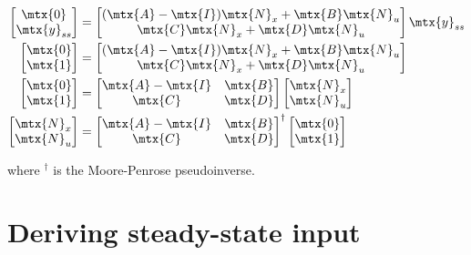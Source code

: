\begin{align*}
  \begin{bmatrix}
    \mtx{0} \\
    \mtx{y}_{ss}
  \end{bmatrix} &=
  \begin{bmatrix}
    (\mtx{A} - \mtx{I})\mtx{N}_x + \mtx{B}\mtx{N}_u \\
    \mtx{C}\mtx{N}_x + \mtx{D}\mtx{N}_u
  \end{bmatrix}
  \mtx{y}_{ss} \\
  \begin{bmatrix}
    \mtx{0} \\
    \mtx{1}
  \end{bmatrix} &=
  \begin{bmatrix}
    (\mtx{A} - \mtx{I})\mtx{N}_x + \mtx{B}\mtx{N}_u \\
    \mtx{C}\mtx{N}_x + \mtx{D}\mtx{N}_u
  \end{bmatrix} \\
  \begin{bmatrix}
    \mtx{0} \\
    \mtx{1}
  \end{bmatrix} &=
  \begin{bmatrix}
    \mtx{A} - \mtx{I} & \mtx{B} \\
    \mtx{C} & \mtx{D}
  \end{bmatrix}
  \begin{bmatrix}
    \mtx{N}_x \\
    \mtx{N}_u
  \end{bmatrix} \\
  \begin{bmatrix}
    \mtx{N}_x \\
    \mtx{N}_u
  \end{bmatrix} &=
  \begin{bmatrix}
    \mtx{A} - \mtx{I} & \mtx{B} \\
    \mtx{C} & \mtx{D}
  \end{bmatrix}^{\dagger}
  \begin{bmatrix}
    \mtx{0} \\
    \mtx{1}
  \end{bmatrix}
\end{align*}

where $^\dagger$ is the Moore-Penrose pseudoinverse.

\section{Deriving steady-state input}

